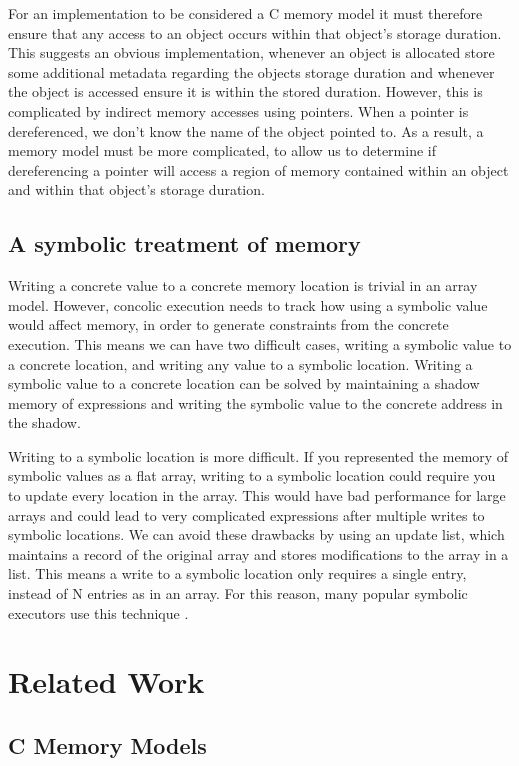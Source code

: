 \documentclass[12pt,twoside]{report}
\begin{document}
For an implementation to be considered a C memory model it must therefore ensure that any access to an object occurs within that object's storage duration. This suggests an obvious implementation, whenever an object is allocated store some additional metadata regarding the objects storage duration and whenever the object is accessed ensure it is within the stored duration. However, this is complicated by indirect memory accesses using pointers. When a pointer is dereferenced, we don't know the name of the object pointed to. As a result, a memory model must be more complicated, to allow us to determine if dereferencing a pointer will access a region of memory contained within an object and within that object's storage duration.

\section{A symbolic treatment of memory}
Writing a concrete value to a concrete memory location is trivial in an array model. However, concolic execution needs to track how using a symbolic value would affect memory, in order to generate constraints from the concrete execution. This means we can have two difficult cases, writing a symbolic value to a concrete location, and writing any value to a symbolic location. Writing a symbolic value to a concrete location can be solved by maintaining a shadow memory of expressions and writing the symbolic value to the concrete address in the shadow.

Writing to a symbolic location is more difficult. If you represented the memory of symbolic values as a flat array, writing to a symbolic location could require you to update every location in the array. This would have bad performance for large arrays and could lead to very complicated expressions after multiple writes to symbolic locations. We can avoid these drawbacks by using an update list, which maintains a record of the original array and stores modifications to the array in a list. This means a write to a symbolic location only requires a single entry, instead of N entries as in an array. For this reason, many popular symbolic executors use this technique \cite{cadar2008klee, cadar2008exe}.



\chapter{Related Work}
\section{C Memory Models}
\end{document}
